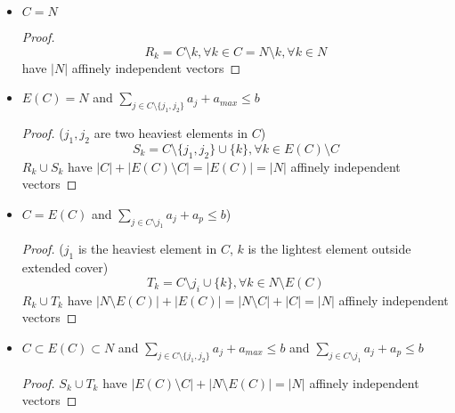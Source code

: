                 \begin{itemize}               
                    \item$C = N$\\
                    \begin{proof}
                        \begin{equation*}
                        R_k = C\setminus k, \forall k \in C = N \setminus k, \forall k \in N 
                    \end{equation*}
                    have $|N|$ affinely independent vectors
                    \end{proof}                
                    \item$E(C) = N$ and $\sum_{j\in C \setminus \{j_1, j_2\}} a_j + a_{max} \le b$\\
                    \begin{proof}
                         ($j_1, j_2$ are two heaviest elements in $C$)
                        \begin{equation*}
                            S_k = C\setminus \{j_1, j_2\}\cup \{k\}, \forall k\in E(C)\setminus C 
                        \end{equation*}
                        $R_k\cup S_k$ have $|C|+|E(C) \setminus C| = |E(C)| = |N|$ affinely independent vectors
                    \end{proof} 
                    \item$C = E(C)$ and $\sum_{j\in C \setminus j_1} a_j + a_p \le b$)\\
                    \begin{proof}
                        ($j_1$ is the heaviest element in $C$, $k$ is the lightest element outside extended cover)
                        \begin{equation*}
                            T_k = C \setminus j_i \cup \{k\}, \forall k\in N\setminus E(C) 
                        \end{equation*}
                        $R_k \cup T_k$ have $|N \setminus E(C)| + |E(C)| = |N\setminus C| + |C| = |N|$  affinely independent vectors
                    \end{proof}
                    \item$C \subset E(C) \subset N$ and $\sum_{j\in C \setminus \{j_1, j_2\}} a_j + a_{max} \le b$ and $\sum_{j\in C \setminus j_1} a_j + a_p \le b$\\
                    \begin{proof}
                        $S_k \cup T_k$ have $|E(C) \setminus C| + |N \setminus E(C)| = |N|$ affinely independent vectors
                    \end{proof}
                \end{itemize}

